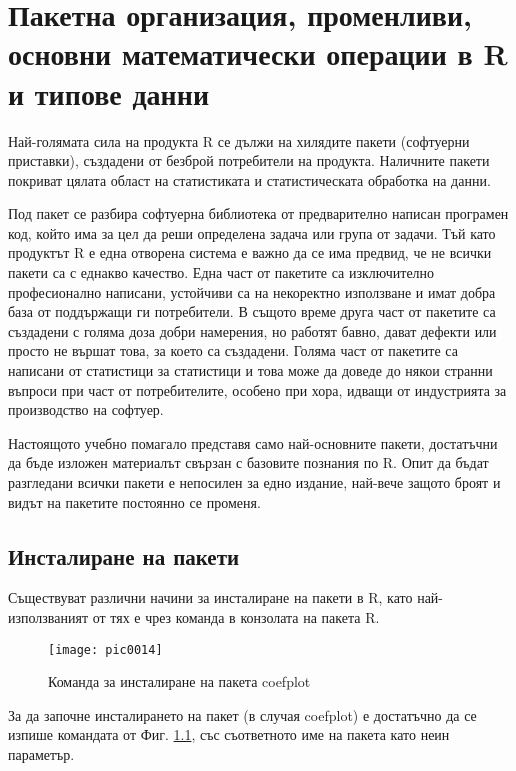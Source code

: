 \newpage
\chapter{Пакетна организация, променливи, основни математически операции в R и типове данни}
\label{chapter02}

Най-голямата сила на продукта R се дължи на хилядите пакети (софтуерни приставки), създадени от безброй потребители на продукта. Наличните пакети покриват цялата област на статистиката и статистическата обработка на данни. 

Под пакет се разбира софтуерна библиотека от предварително написан програмен код, който има за цел да реши определена задача или група от задачи. Тъй като продуктът R е една отворена система е важно да се има предвид, че не всички пакети са с еднакво качество. Една част от пакетите са изключително професионално написани, устойчиви са на некоректно използване и имат добра база от поддържащи ги потребители. В същото време друга част от пакетите са създадени с голяма доза добри намерения, но работят бавно, дават дефекти или просто не вършат това, за което са създадени. Голяма част от пакетите са написани от статистици за статистици и това може да доведе до някои странни въпроси при част от потребителите, особено при хора, идващи от индустрията за производство на софтуер.

Настоящото учебно помагало представя само най-основните пакети, достатъчни да бъде изложен материалът свързан с базовите познания по R. Опит да бъдат разгледани всички пакети е непосилен за едно издание, най-вече защото броят и видът на пакетите постоянно се променя.

\section{Инсталиране на пакети}

Съществуват различни начини за инсталиране на пакети в R, като най-използваният от тях е чрез команда в конзолата на пакета R.

\begin{figure}[h!]
  \centering
  \texttt{[image: pic0014]}
  \caption{Команда за инсталиране на пакета coefplot}
\label{figure0014}
\end{figure}
\FloatBarrier

За да започне инсталирането на пакет (в случая coefplot) е достатъчно да се изпише командата от Фиг. \ref{figure0014}, със съответното име на пакета като неин параметър.

